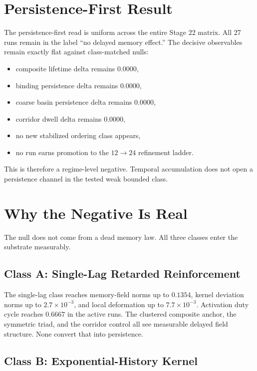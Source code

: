 \documentclass[11pt]{article}
\begin{document}
\section{Persistence-First Result}

The persistence-first read is uniform across the entire Stage 22 matrix. All 27 runs remain in the label ``no delayed memory effect.'' The decisive observables remain exactly flat against class-matched nulls:
\begin{itemize}
\item composite lifetime delta remains $0.0000$,
\item binding persistence delta remains $0.0000$,
\item coarse basin persistence delta remains $0.0000$,
\item corridor dwell delta remains $0.0000$,
\item no new stabilized ordering class appears,
\item no run earns promotion to the $12\rightarrow24$ refinement ladder.
\end{itemize}

This is therefore a regime-level negative. Temporal accumulation does not open a persistence channel in the tested weak bounded class.

\section{Why the Negative Is Real}

The null does not come from a dead memory law. All three classes enter the substrate measurably.

\subsection{Class A: Single-Lag Retarded Reinforcement}

The single-lag class reaches memory-field norms up to $0.1354$, kernel deviation norms up to $2.7\times10^{-3}$, and local deformation up to $7.7\times10^{-3}$. Activation duty cycle reaches $0.6667$ in the active runs. The clustered composite anchor, the symmetric triad, and the corridor control all see measurable delayed field structure. None convert that into persistence.

\subsection{Class B: Exponential-History Kernel}
\end{document}
